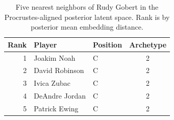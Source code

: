 \begin{table}[htbp]
  \centering\small
  \begin{tabular}{rllc}
    \toprule
    Rank & Player & Position & Archetype \\
    \midrule
    1 & Joakim Noah & C & 2 \\
    2 & David Robinson & C & 2 \\
    3 & Ivica Zubac & C & 2 \\
    4 & DeAndre Jordan & C & 2 \\
    5 & Patrick Ewing & C & 2 \\
    \bottomrule
  \end{tabular}
  \caption{Five nearest neighbors of Rudy Gobert in the Procrustes-aligned posterior latent space. Rank is by posterior mean embedding distance.}
\end{table}

